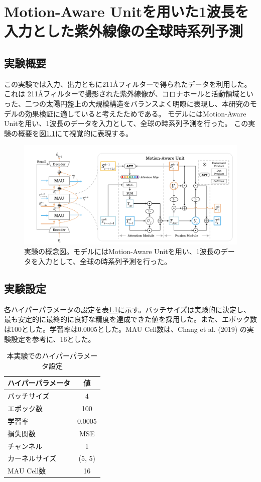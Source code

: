 \chapter{Motion-Aware Unitを用いた1波長を入力とした紫外線像の全球時系列予測}
  \section{実験概要}
  この実験では入力、出力ともに211Åフィルターで得られたデータを利用した。
  これは 211Åフィルターで撮影された紫外線像が、コロナホールと活動領域といった、二つの太陽円盤上の大規模構造をバランスよく明瞭に表現し、本研究のモデルの効果検証に適していると考えたためである。
  モデルにはMotion-Aware Unitを用い、1波長のデータを入力として、全球の時系列予測を行った。
  この実験の概要を図\ref{fig:exp1_overview}にて視覚的に表現する。

  \begin{figure}[htpb]
    \centering
    \includegraphics[width=\textwidth]{figures/mau.png}
    \caption{実験の概念図。モデルにはMotion-Aware Unitを用い、1波長のデータを入力として、全球の時系列予測を行った。}
    \label{fig:exp1_overview}
  \end{figure}

  \section{実験設定}
    各ハイパーパラメータの設定を表\ref{tab:exp1_hyperparameters}に示す。バッチサイズは実験的に決定し、最も安定的に最終的に良好な精度を達成できた値を採用した。また、エポック数は100とした。学習率は0.0005とした。MAU Cell数は、Chang et al. (2019) \cite{chang2021mau} の実験設定を参考に、16とした。
    \begin{table}[htpb]
      \centering
      \begin{tabular}{lc}
      \hline
      ハイパーパラメータ & 値 \\
      \hline\hline
      バッチサイズ & 4 \\
      \hline
      エポック数 & 100 \\
      \hline
      学習率 & 0.0005 \\
      \hline
      損失関数 & MSE \\
      \hline
      チャンネル & 1 \\
      \hline
      カーネルサイズ & (5, 5) \\
      \hline
      MAU Cell数 & 16 \\
      \hline
      \end{tabular}
      \caption{本実験でのハイパーパラメータ設定}
      \label{tab:exp1_hyperparameters}
    \end{table}

